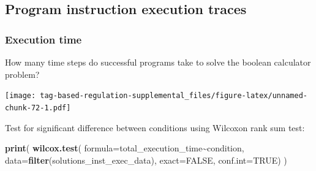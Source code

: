 \documentclass[
]{book}
\newenvironment{Shaded}{\begin{snugshade}}{\end{snugshade}}
\newcommand{\CharTok}[1]{\textcolor[rgb]{0.31,0.60,0.02}{#1}}
\newcommand{\CommentTok}[1]{\textcolor[rgb]{0.56,0.35,0.01}{\textit{#1}}}
\newcommand{\DataTypeTok}[1]{\textcolor[rgb]{0.13,0.29,0.53}{#1}}
\newcommand{\FloatTok}[1]{\textcolor[rgb]{0.00,0.00,0.81}{#1}}
\newcommand{\KeywordTok}[1]{\textcolor[rgb]{0.13,0.29,0.53}{\textbf{#1}}}
\newcommand{\NormalTok}[1]{#1}
\newcommand{\OperatorTok}[1]{\textcolor[rgb]{0.81,0.36,0.00}{\textbf{#1}}}
\newcommand{\OtherTok}[1]{\textcolor[rgb]{0.56,0.35,0.01}{#1}}
\newcommand{\StringTok}[1]{\textcolor[rgb]{0.31,0.60,0.02}{#1}}
\begin{document}
\hypertarget{program-instruction-execution-traces-2}{%
\subsection{Program instruction execution traces}\label{program-instruction-execution-traces-2}}

\hypertarget{execution-time-2}{%
\subsubsection{Execution time}\label{execution-time-2}}

How many time steps do successful programs take to solve the boolean calculator problem?

\begin{Shaded}
\end{Shaded}

\texttt{[image: tag-based-regulation-supplemental\_files/figure-latex/unnamed-chunk-72-1.pdf]}

Test for significant difference between conditions using Wilcoxon rank sum test:

\begin{Shaded}
\begin{Highlighting}[]
\KeywordTok{print}\NormalTok{(}
  \KeywordTok{wilcox.test}\NormalTok{(}
    \DataTypeTok{formula=}\NormalTok{total\_execution\_time}\OperatorTok{\textasciitilde{}}\NormalTok{condition,}
    \DataTypeTok{data=}\KeywordTok{filter}\NormalTok{(solutions\_inst\_exec\_data),}
    \DataTypeTok{exact=}\OtherTok{FALSE}\NormalTok{,}
    \DataTypeTok{conf.int=}\OtherTok{TRUE}\NormalTok{)}
\NormalTok{)}
\end{Highlighting}
\end{Shaded}
\end{document}
